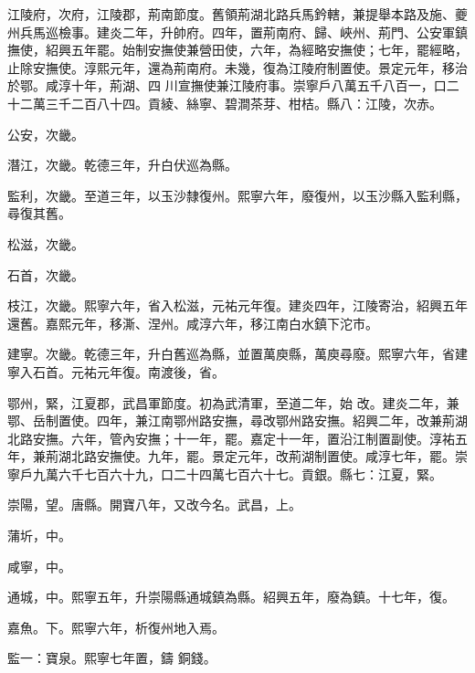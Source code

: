 \begin{pinyinscope}
 江陵府，次府，江陵郡，荊南節度。舊領荊湖北路兵馬鈐轄，兼提舉本路及施、夔州兵馬巡檢事。建炎二年，升帥府。四年，置荊南府、歸、峽州、荊門、公安軍鎮撫使，紹興五年罷。始制安撫使兼營田使，六年，為經略安撫使；七年，罷經略，止除安撫使。淳熙元年，還為荊南府。未幾，復為江陵府制置使。景定元年，移治於鄂。咸淳十年，荊湖、四
 川宣撫使兼江陵府事。崇寧戶八萬五千八百一，口二十二萬三千二百八十四。貢綾、絲寧、碧澗茶芽、柑桔。縣八：江陵，次赤。



 公安，次畿。



 潛江，次畿。乾德三年，升白伏巡為縣。



 監利，次畿。至道三年，以玉沙隸復州。熙寧六年，廢復州，以玉沙縣入監利縣，尋復其舊。



 松滋，次畿。



 石首，次畿。



 枝江，次畿。熙寧六年，省入松滋，元祐元年復。建炎四年，江陵寄治，紹興五年還舊。嘉熙元年，移澌、涅州。咸淳六年，移江南白水鎮下沱市。



 建寧。次畿。乾德三年，升白舊巡為縣，並置萬庾縣，萬庾尋廢。熙寧六年，省建寧入石首。元祐元年復。南渡後，省。



 鄂州，緊，江夏郡，武昌軍節度。初為武清軍，至道二年，始
 改。建炎二年，兼鄂、岳制置使。四年，兼江南鄂州路安撫，尋改鄂州路安撫。紹興二年，改兼荊湖北路安撫。六年，管內安撫；十一年，罷。嘉定十一年，置沿江制置副使。淳祐五年，兼荊湖北路安撫使。九年，罷。景定元年，改荊湖制置使。咸淳七年，罷。崇寧戶九萬六千七百六十九，口二十四萬七百六十七。貢銀。縣七：江夏，緊。



 崇陽，望。唐縣。開寶八年，又改今名。武昌，上。



 蒲圻，中。



 咸寧，中。



 通城，中。熙寧五年，升崇陽縣通城鎮為縣。紹興五年，廢為鎮。十七年，復。



 嘉魚。下。熙寧六年，析復州地入焉。



 監一：寶泉。熙寧七年置，鑄
 銅錢。




\end{pinyinscope}
